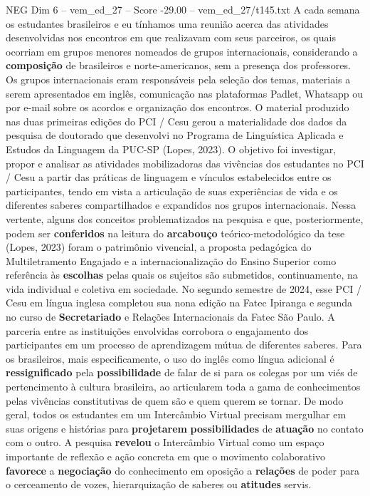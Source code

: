 \begin{textsample}{NEG Dim 6 – vem\_ed\_27 – Score -29.00 – vem\_ed\_27/t145.txt}
A cada semana os estudantes brasileiros e eu tínhamos uma reunião acerca das atividades desenvolvidas nos encontros em que realizavam com seus parceiros, os quais ocorriam em grupos menores nomeados de grupos internacionais, considerando a \textbf{composição} de brasileiros e norte-americanos, sem a presença dos professores.
Os grupos internacionais eram responsáveis pela seleção dos temas, materiais a serem apresentados em inglês, comunicação nas plataformas Padlet, Whatsapp ou por e-mail sobre os acordos e organização dos encontros.
O material produzido nas duas primeiras edições do PCI / Cesu gerou a materialidade dos dados da pesquisa de doutorado que desenvolvi no Programa de Linguística Aplicada e Estudos da Linguagem da PUC-SP (Lopes, 2023).
O objetivo foi investigar, propor e analisar as atividades mobilizadoras das vivências dos estudantes no PCI / Cesu a partir das práticas de linguagem e vínculos estabelecidos entre os participantes, tendo em vista a articulação de suas experiências de vida e os diferentes saberes compartilhados e expandidos nos grupos internacionais.
Nessa vertente, alguns dos conceitos problematizados na pesquisa e que, posteriormente, podem ser \textbf{conferidos} na leitura do \textbf{arcabouço} teórico-metodológico da tese (Lopes, 2023) foram o patrimônio vivencial, a proposta pedagógica do Multiletramento Engajado e a internacionalização do Ensino Superior como referência às \textbf{escolhas} pelas quais os sujeitos são submetidos, continuamente, na vida individual e coletiva em sociedade.
No segundo semestre de 2024, esse PCI / Cesu em língua inglesa completou sua nona edição na Fatec Ipiranga e segunda no curso de \textbf{Secretariado} e Relações Internacionais da Fatec São Paulo.
A parceria entre as instituições envolvidas corrobora o engajamento dos participantes em um processo de aprendizagem mútua de diferentes saberes.
Para os brasileiros, mais especificamente, o uso do inglês como língua adicional é \textbf{ressignificado} pela \textbf{possibilidade} de falar de si para os colegas por um viés de pertencimento à cultura brasileira, ao articularem toda a gama de conhecimentos pelas vivências constitutivas de quem são e quem querem se tornar.
De modo geral, todos os estudantes em um Intercâmbio Virtual precisam mergulhar em suas origens e histórias para \textbf{projetarem} \textbf{possibilidades} de \textbf{atuação} no contato com o outro.
A pesquisa \textbf{revelou} o Intercâmbio Virtual como um espaço importante de reflexão e ação concreta em que o movimento colaborativo \textbf{favorece} a \textbf{negociação} do conhecimento em oposição a \textbf{relações} de poder para o cerceamento de vozes, hierarquização de saberes ou \textbf{atitudes} servis.

\end{textsample}
